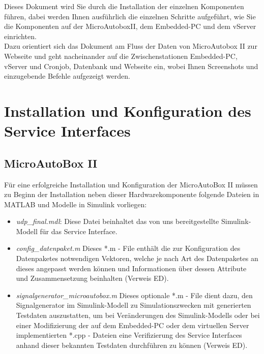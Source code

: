 \documentclass[fontsize = 12pt, paper = a4]{scrreprt}
\begin{document}
Dieses Dokument wird Sie durch die Installation der 
einzelnen Komponenten führen, dabei werden Ihnen ausführlich 
die einzelnen Schritte aufgeführt, wie Sie die Komponenten 
auf der MicroAutoboxII, dem Embedded-PC und dem vServer 
einrichten. \\
Dazu orientiert sich das Dokument am Fluss der 
Daten von MicroAutobox II zur Webseite und geht nacheinander 
auf die Zwischenstationen Embedded-PC, vServer und Cronjob, 
Datenbank und Webseite ein, wobei Ihnen Screenshots und 
einzugebende Befehle aufgezeigt werden.


\chapter{Installation und Konfiguration des Service Interfaces}



\section{MicroAutoBox II}

Für eine erfolgreiche Installation und Konfiguration der MicroAutoBox II müssen zu Beginn der Installation neben dieser Hardwarekomponente folgende Dateien in MATLAB und Modelle in Simulink vorliegen:

\begin{itemize}

\item \textit{udp\_final.mdl}: Diese Datei beinhaltet das von uns bereitgestellte Simulink-Modell für das Service Interface.

\item \textit{config\_datenpaket.m} Dieses *.m - File enthält die zur Konfiguration des Datenpaketes notwendigen Vektoren, welche je nach Art des Datenpaketes an dieses angepasst werden können und Informationen über dessen Attribute und Zusammensetzung beinhalten (Verweis ED).

\item \textit{signalgenerator\_microautobox.m} Dieses optionale *.m - File dient dazu, den Signalgenerator im Simulink-Modell zu Simulationszwecken mit generierten Testdaten auszustatten, um bei Veränderungen des Simulink-Modells oder bei einer Modifizierung der   auf dem Embedded-PC oder dem virtuellen Server implementierten *.cpp - Dateien eine Verifizierung des Service Interfaces anhand dieser bekannten Testdaten durchführen zu können (Verweis ED).

\end{itemize} 
\end{document}

